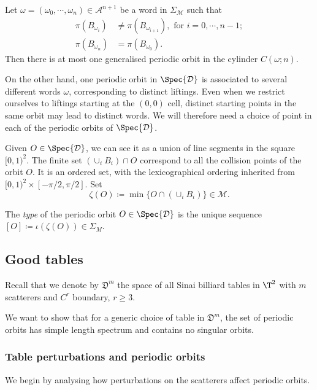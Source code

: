 \documentclass[reqno,11pt]{amsart}
\begin{document}
\begin{theorem}\label{thm:bunimovich_periodic} 
    Let \(  \omega = (\omega_0, \cdots, \omega_n)\in \mathcal{A}^{n+1} \) be a word in \( \Sigma_{\mathcal{M}} \) such that 
    \begin{align*}
        \pi(B_{\omega_i}) &\neq \pi(B_{\omega_{i+1}}), \text{ for } i = 0, \cdots, n-1; \\
        \pi(B_{\omega_n}) &= \pi(B_{\omega_0}).
    \end{align*}
    Then there is at most one generalised periodic orbit in the cylinder \( C(\omega; n) \).
\end{theorem}

\par On the other hand, one periodic orbit in \( \Spec{\mathcal{D}} \) is associated to several different words \( \omega \), corresponding to distinct liftings.
Even when we restrict ourselves to liftings starting at the \( (0,0) \) cell, distinct starting points in the same orbit may lead to distinct words. 
We will therefore need a choice of point in each of the periodic orbits of \( \Spec{\mathcal{D}} \).
\par Given \( O \in \Spec{\mathcal{D}} \), we can see it as a union of line segments in the square \( [0,1)^2. \) 
The finite set \( (\cup_i B_i) \cap O \) correspond to all the collision points of the orbit \( O \).
It is an ordered set, with the lexicographical ordering inherited from \( [0,1)^2 \times [-\pi/2, \pi/2] \). 
Set
\[
    \zeta(O) \coloneqq \min \{O \cap (\cup_i B_i)\} \in \mathcal{M}.
\]
\begin{defi}
    The \emph{type} of the periodic orbit \( O \in \Spec{\mathcal{D}} \) is the unique sequence \( [O] \coloneqq \iota(\zeta(O)) \in \Sigma_M \).
\end{defi}
\subsection{Good tables}\label{sec:good_tables}
Recall that we denote by \( \mathfrak{D}^m \) the space  of all Sinai billiard tables in \( \T^2 \) with \( m \) scatterers and $C^r$ boundary, $r \geq 3$.  
\par We want to show that for a generic choice of table in \( \mathfrak{D}^m \), the set of periodic orbits has simple length spectrum and contains no singular orbits. 
\newline
\subsubsection{Table perturbations and periodic orbits}
We begin by analysing how perturbations on the scatterers affect periodic orbits.
\end{document}

